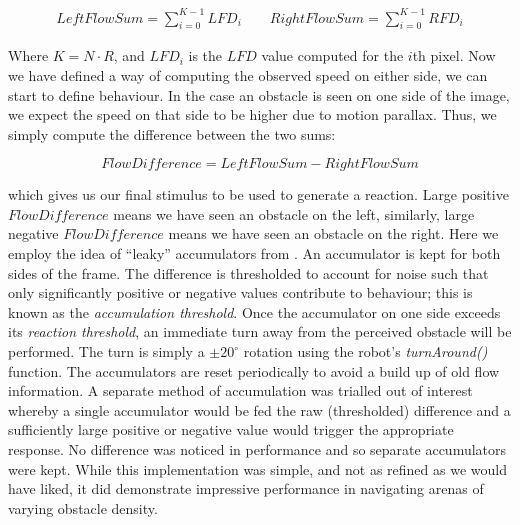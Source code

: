 \documentclass[a4paper,11pt,twoside,openright]{article}
\begin{document}
\begin{align}
  LeftFlowSum = \sum_{i = 0}^{K - 1} LFD_i \qquad
  RightFlowSum = \sum_{i = 0}^{K - 1} RFD_i
\end{align}

Where $ K = N \cdot R$, and $LFD_i$ is the $LFD$ value computed for the $i$th pixel.
Now we have defined a way of computing the observed speed on either side, we
can start to define behaviour. In the case an obstacle is seen on one side of the image, we expect the speed
on that side to be higher due to motion parallax. Thus, we simply compute the difference between the
two sums:

\begin{equation}
FlowDifference = LeftFlowSum - RightFlowSum
\end{equation}

which gives us our final stimulus to be used to generate a reaction. Large positive $FlowDifference$ means we
have seen an obstacle on the left, similarly, large negative $FlowDifference$ means we have seen an obstacle on
the right. Here we employ the idea of ``leaky'' accumulators
from \cite{Stewart2010}. An accumulator is kept for both sides of the frame. The difference is thresholded to account
for noise such that only significantly positive or negative values contribute to behaviour; this is known as the
\textit{accumulation threshold}. Once the accumulator on one side exceeds its \textit{reaction threshold}, an immediate
turn away from the perceived obstacle will be performed. The turn is simply a $\pm 20^{\circ}$ rotation using the robot's
\textit{turnAround()} function. The accumulators are reset periodically to avoid a build up of old flow information.
A separate method of accumulation was trialled out of interest whereby a single accumulator would be fed the raw (thresholded) difference
and a sufficiently large positive or negative value would trigger the appropriate response. No difference was noticed in
performance and so separate accumulators were kept. While this implementation was simple, and not as refined
as we would have liked, it did demonstrate impressive performance in navigating arenas of varying obstacle density.
\end{document}
